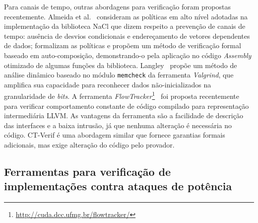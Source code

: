 Para canais de tempo, outras abordagens para verificação foram propostas recentemente.
Almeida et al.~\cite{AlmeidaBarbosa:2011} consideram as políticas em alto nível adotadas
na implementação da biblioteca NaCl que dizem respeito a prevenção de canais de tempo:
ausência de desvios condicionais e endereçamento de vetores dependentes de dados;
formalizam as políticas e propõem um método de verificação formal baseado em auto-composição,
demonstrando-o pela aplicação no código \emph{Assembly} otimizado de algumas funções da biblioteca.
Langley~\cite{Langley:2012} propõe um método de análise dinâmico baseado no módulo 
\texttt{memcheck} da ferramenta \emph{Valgrind}, que amplifica sua capacidade para
reconhecer dados não-inicializados na granularidade de \emph{bits}. A ferramenta \emph{FlowTracker}\footnote{\url{http://cuda.dcc.ufmg.br/flowtracker/}}~\cite{RodriguesPA16} foi proposta recentemente para verificar comportamento constante de código compilado para representação intermediária LLVM. As vantagens da ferramenta são a facilidade de descrição das interfaces e a baixa intrusão, já que nenhuma alteração é necessária no código. CT-Verif é uma abordagem similar que fornece garantias formais adicionais, mas exige alteração do código pelo provador.

\subsection{Ferramentas para verificação de implementações contra ataques de potência}




